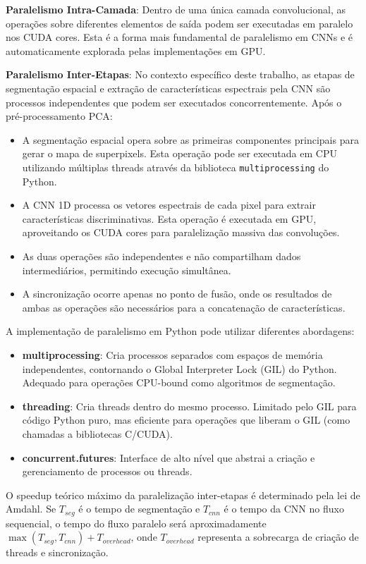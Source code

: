 \textbf{Paralelismo Intra-Camada}: Dentro de uma única camada convolucional, as operações sobre diferentes elementos de saída podem ser executadas em paralelo nos CUDA cores. Esta é a forma mais fundamental de paralelismo em CNNs e é automaticamente explorada pelas implementações em GPU.

\textbf{Paralelismo Inter-Etapas}: No contexto específico deste trabalho, as etapas de segmentação espacial e extração de características espectrais pela CNN são processos independentes que podem ser executados concorrentemente. Após o pré-processamento PCA:
\begin{itemize}
    \item A segmentação espacial opera sobre as primeiras componentes principais para gerar o mapa de superpixels. Esta operação pode ser executada em CPU utilizando múltiplas threads através da biblioteca \texttt{multiprocessing} do Python.
    \item A CNN 1D processa os vetores espectrais de cada pixel para extrair características discriminativas. Esta operação é executada em GPU, aproveitando os CUDA cores para paralelização massiva das convoluções.
    \item As duas operações são independentes e não compartilham dados intermediários, permitindo execução simultânea.
    \item A sincronização ocorre apenas no ponto de fusão, onde os resultados de ambas as operações são necessários para a concatenação de características.
\end{itemize}

A implementação de paralelismo em Python pode utilizar diferentes abordagens:
\begin{itemize}
    \item \textbf{multiprocessing}: Cria processos separados com espaços de memória independentes, contornando o Global Interpreter Lock (GIL) do Python. Adequado para operações CPU-bound como algoritmos de segmentação.
    \item \textbf{threading}: Cria threads dentro do mesmo processo. Limitado pelo GIL para código Python puro, mas eficiente para operações que liberam o GIL (como chamadas a bibliotecas C/CUDA).
    \item \textbf{concurrent.futures}: Interface de alto nível que abstrai a criação e gerenciamento de processos ou threads.
\end{itemize}

O speedup teórico máximo da paralelização inter-etapas é determinado pela lei de Amdahl. Se $T_{seg}$ é o tempo de segmentação e $T_{cnn}$ é o tempo da CNN no fluxo sequencial, o tempo do fluxo paralelo será aproximadamente $\max(T_{seg}, T_{cnn}) + T_{overhead}$, onde $T_{overhead}$ representa a sobrecarga de criação de threads e sincronização.

